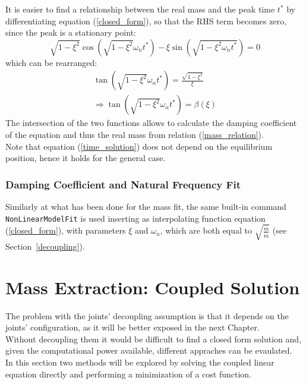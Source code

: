 \documentclass[a4paper,12pt,oneside]{report}
\begin{document}
It is easier to find a relationship between the real mass and the peak time $t^*$ by differentiating equation (\ref{closed_form}), so that the RHS term becomes zero, since the peak is a stationary point:
\begin{equation}
  \sqrt{1-\xi^2}\cos{(\sqrt{1-\xi^2}\omega_nt^*)-\xi\sin{(\sqrt{1-\xi^2\omega_nt^*})}}=0
  \label{time_solution}
\end{equation}
which can be rearranged:
\begin{equation}
  \begin{array}{l}
  \tan{(\sqrt{1-\xi^2}\omega_nt^*)}=\frac{\sqrt{1-\xi^2}}{\xi}\\
  \Rightarrow \tan{(\sqrt{1-\xi^2}\omega_nt^*)}=\beta(\xi)
\end{array}
\end{equation}
The intersection of the two functions allows to calculate the damping coefficient of the equation and thus the real mass from relation (\ref{mass_relation}).\\
Note that equation (\ref{time_solution}) does not depend on the equilibrium position, hence it holds for the general case.
\subsubsection{Damping Coefficient and Natural Frequency Fit}
Similarly at what has been done for the mass fit, the same built-in command \texttt{NonLinearModelFit} is used inserting as interpolating function equation (\ref{closed_form}), with parameters $\xi$ and $\omega_n$, which are both equal to $\sqrt{\frac{\hat{m}}{\tilde{m}}}$ (see Section~\ref{decoupling}).
\newpage
\section{Mass Extraction: Coupled Solution}
The problem with the joints' decoupling assumption is that it depends on the joints' configuration, as it will be better exposed in the next Chapter.\\
Without decoupling them it would be difficult to find a closed form solution and, given the computational power available, different appraches can be evaulated.\\
In this section two methods will be explored by solving the coupled linear equation directly and performing a minimization of a cost function.
\end{document}
